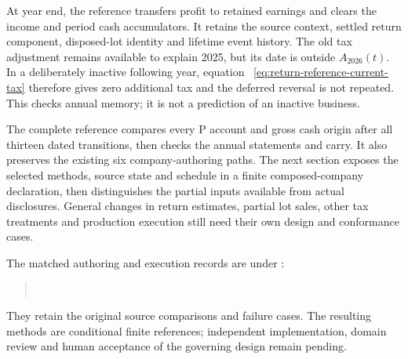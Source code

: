 At year end, the reference transfers profit to retained earnings and clears
the income and period cash accumulators. It retains the source context,
settled return component, disposed-lot identity and lifetime event history.
The old tax adjustment remains available to explain 2025, but its date is
outside $A_{2026}(t)$. In a deliberately inactive following year, equation~
\eqref{eq:return-reference-current-tax} therefore gives zero additional tax
and the deferred reversal is not repeated. This checks annual memory; it is
not a prediction of an inactive business.

The complete reference compares every P account and gross cash origin after
all thirteen dated transitions, then checks the annual statements and carry.
It also preserves the existing six company-authoring paths. The next
section exposes the selected methods, source state and schedule in a finite
composed-company declaration, then distinguishes the partial inputs available
from actual disclosures. General changes
in return estimates, partial lot sales, other tax treatments and production
execution still need their own design and conformance cases.

The matched authoring and execution records are under
:
\begin{quote}\small
{}\\
\end{quote}
They retain
the original source comparisons and failure cases. The resulting methods are
conditional finite references; independent implementation, domain review and
human acceptance of the governing design remain pending.


